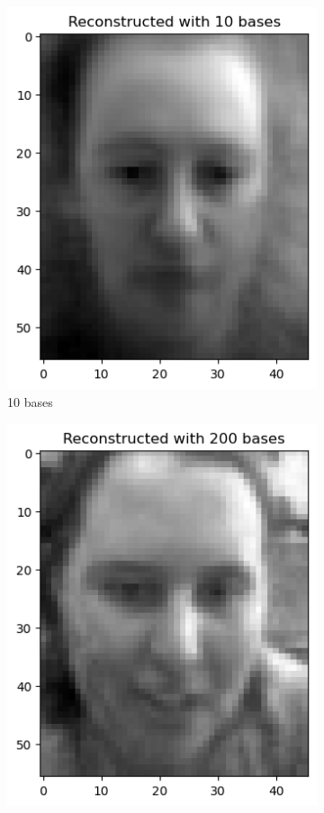 \begin{figure}[htbp]
\begin{subfigure}[t]{0.2\linewidth}
		\includegraphics[width=\linewidth]{image/q1_recon_train_10.png}
		\caption{10 bases}
		\label{fig:train_re_10}
	\end{subfigure}
    \hfill
	\begin{subfigure}[t]{0.2\linewidth}
		\centering
		\includegraphics[width=\linewidth]{image/q1_recon_train_200.png}

\end{subfigure}
\end{figure}
